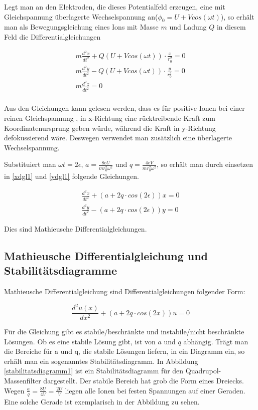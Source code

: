 \documentclass[10pt,a4paper]{article}
\begin{document}
 Legt man an den Elektroden, die dieses Potentialfeld erzeugen, eine mit Gleichspannung überlagerte Wechselspannung an($\phi _0 = U + V cos(\omega t)$), so erhält man als Bewegungsgleichung eines Ions mit Masse $m$ und Ladung $Q$ in diesem Feld die Differentialgleichungen

\begin{align}
	m\frac{d^2x}{dt^2} + Q(U + V cos(\omega t)) \cdot \frac{x}{r_0^2} = 0 
	\label{xdgl1}\\
	m\frac{d^2y}{dt^2} - Q(U + V cos(\omega t)) \cdot \frac{y}{r_0^2} = 0 
	\label{ydgl1}\\
	m\frac{d^2z}{dt^2} = 0 \\
\end{align}

Aus den Gleichungen kann gelesen werden, dass es für positive Ionen bei einer reinen Gleichspannung , in x-Richtung eine rücktreibende Kraft zum Koordinatenursprung geben würde, während die Kraft in y-Richtung defokussierend wäre. Deswegen verwendet man zusätzlich eine überlagerte Wechselspannung.

Substituiert man $\omega t = 2\epsilon$, $a = \frac{8 e U}{m r_0^2 \omega^2}$ und $q = \frac{4 e V}{m r_0^2 \omega^2}$, so erhält man durch einsetzen in \eqref{xdgl1} und \eqref{ydgl1} folgende Gleichungen.

\begin{align}
	\frac{d^2x}{dt^2} + (a + 2q \cdot cos(2\epsilon)) x = 0\\
	\frac{d^2y}{dt^2} - (a + 2q \cdot cos(2\epsilon)) y = 0
\end{align}

Dies sind Mathieusche Differentialgleichungen.



\subsection{Mathieusche Differentialgleichung und Stabilitätsdiagramme}

Mathieusche Differentialgleichung sind Differentialgleichungen folgender Form:

\begin{equation}
	\frac{d^2u(x)}{dx^2} + (a + 2q \cdot cos(2x)) u = 0
\end{equation}

Für die Gleichung gibt es stabile/beschränkte und instabile/nicht beschränkte Lösungen. Ob es eine stabile Lösung gibt, ist von $a$ und $q$ abhängig. Trägt man die Bereiche für a und q, die stabile Lösungen liefern, in ein Diagramm ein, so erhält man ein sogenanntes Stabilitätsdiagramm. In Abbildung \ref{stabilitatsdiagramm1} ist ein Stabilitätsdiagramm für den Quadrupol-Massenfilter dargestellt. Der stabile Bereich hat grob die Form eines Dreiecks. Wegen $\frac{a}{q} = \frac{8 U}{4 V} = \frac{2 U}{V}$ liegen alle Ionen bei festen Spannungen auf einer Geraden. Eine solche Gerade ist exemplarisch in der Abbildung zu sehen. 
\end{document}
